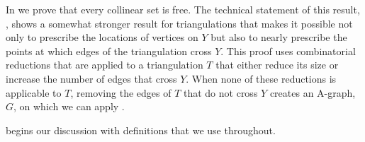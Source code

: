 In  we prove that every collinear set is free.
The technical statement of this result, , shows a somewhat
stronger result for triangulations that makes it possible not only to
prescribe the locations of vertices on $Y$ but also to nearly prescribe the
points at which edges of the triangulation cross $Y$.  This proof uses combinatorial
reductions that are applied to a triangulation $T$ that either reduce its
size or increase the number of edges that cross $Y$.  When none of these
reductions is applicable to $T$, removing the edges of $T$ that do not
cross $Y$ creates an A-graph, $G$, on which we can apply .

 begins our discussion with definitions %
 that we use throughout.

